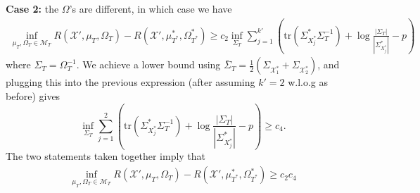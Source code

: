 \textbf{Case 2:} the $\Omega$'s are different, in which case we have
\begin{align}
    \inf_{\mu_T, \Omega_T \in \mathcal{M}_T } R(\mathcal{X}',\mu_T,\Omega_T) - R(\mathcal{X}',\mu_{T^*}^*,\Omega_{T^*}^*) 
    \geq
    c_2 \inf_{\Sigma_T} \sum_{j=1}^{k'} \left( \text{tr}\left( \Sigma_{X_j^*}^* \Sigma_T^{-1} \right) + \log \frac{|\Sigma_T|}{|\Sigma_{X_j^*}^*|} - p \right)
\end{align}
where $\Sigma_T = \Omega_T^{-1}$. We achieve a lower bound using $\bar{\Sigma}_T = \frac{1}{2} \left( \Sigma_{\mathcal{X}_1^*} + \Sigma_{\mathcal{X}_2^*} \right)$, and plugging this into the previous expression (after assuming $k'=2$ w.l.o.g as before) gives
\begin{equation}
    \inf_{\Sigma_T} \sum_{j=1}^{2} \left( \text{tr}\left( \Sigma_{X_j^*}^* \Sigma_T^{-1} \right) + \log \frac{|\Sigma_T|}{|\Sigma_{X_j^*}^*|} - p \right)
     \geq c_4.
\end{equation}
The two statements taken together imply that 
\begin{align}
    \inf_{\mu_T, \Omega_T \in \mathcal{M}_T } R(\mathcal{X}',\mu_T,\Omega_T) - R(\mathcal{X}',\mu_{T^*}^*,\Omega_{T^*}^*) \geq c_2 c_4
\end{align}

